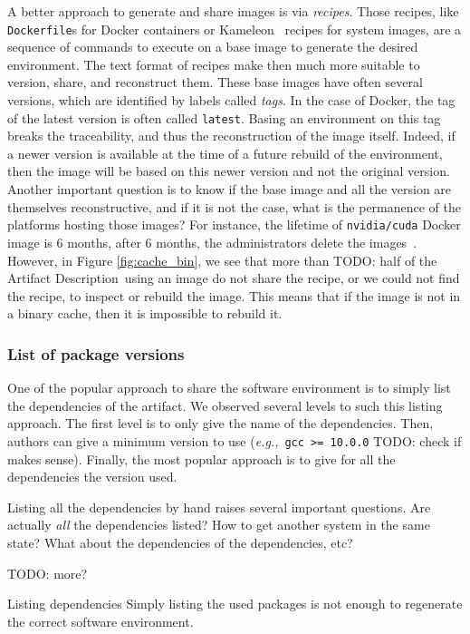 \documentclass[sigconf,natbib=false]{acmart}
\newcommand{\eg}{\emph{e.g.,}}
\newcommand{\ad}{Artifact Description}
\newcommand{\todo}[1]{{\color{red}TODO: #1}}
\begin{document}
A better approach to generate and share images is via \emph{recipes}.
Those recipes, like \texttt{Dockerfile}s for Docker containers or Kameleon\ \cite{ruiz_reconstructable_2015} recipes for system images, are a sequence of commands to execute on a base image to generate the desired environment.
The text format of recipes make then much more suitable to version, share, and reconstruct them.
These base images have often several versions, which are identified by labels called \emph{tags}.
In the case of Docker, the tag of the latest version is often called \texttt{latest}.
Basing an environment on this tag breaks the traceability, and thus the reconstruction of the image itself.
Indeed, if a newer version is available at the time of a future rebuild of the environment, then the image will be based on this newer version and not the original version.
Another important question is to know if the base image and all the version are themselves reconstructive, and if it is not the case, what is the permanence of the platforms hosting those images?
For instance, the lifetime of \texttt{nvidia/cuda} Docker image is 6 months, after 6 months, the administrators delete the images\ \cite{nvidia_cuda_lifetime}.
However, in Figure \ref{fig:cache_bin}, we see that more than \todo{half} of the \ad\ using an image do not share the recipe, or we could not find the recipe, to inspect or rebuild the image.
This means that if the image is not in a binary cache, then it is impossible to rebuild it.


\subsubsection{List of package versions}\label{sec:sop:sw:list}

One of the popular approach to share the software environment is to simply list the dependencies of the artifact.
We observed several levels to such this listing approach.
The first level is to only give the name of the dependencies.
Then, authors can give a minimum version to use (\eg\ \texttt{gcc >= 10.0.0} \todo{check if makes sense}).
Finally, the most popular approach is to give for all the dependencies the version used.

Listing all the dependencies by hand raises several important questions.
Are actually \emph{all} the dependencies listed?
How to get another system in the same state?
What about the dependencies of the dependencies, etc?

\todo{more?}

\begin{lesson}{Listing dependencies}{}
  Simply listing the used packages is not enough to regenerate the correct software environment.
\end{lesson}
\end{document}
